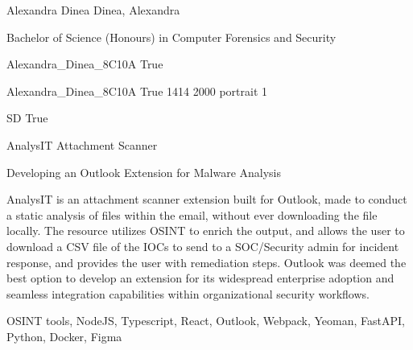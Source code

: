 
\begingroup{}\relax



\def\Key{Alexandra_Dinea_8C10A}

{Alexandra Dinea}
{Dinea, Alexandra}

{Bachelor of Science (Honours) in Computer Forensics and Security}

{Alexandra_Dinea_8C10A}
{True}

{Alexandra_Dinea_8C10A}
{True}
{1414}
{2000}
{portrait}
{1}

{SD}
{True}

{AnalysIT Attachment Scanner}

{Developing an Outlook Extension for Malware Analysis}

{AnalysIT is an attachment scanner extension built for Outlook, made to conduct a static analysis of files within the email, without ever downloading the file locally. The resource utilizes OSINT to enrich the output, and allows the user to download a CSV file of the IOCs to send to a SOC/Security admin for incident response, and provides the user with remediation steps. Outlook was deemed the best option to develop an extension for its widespread enterprise adoption and seamless integration capabilities within organizational security workflows.}

{OSINT tools, NodeJS, Typescript, React, Outlook, Webpack, Yeoman, FastAPI, Python, Docker, Figma}

